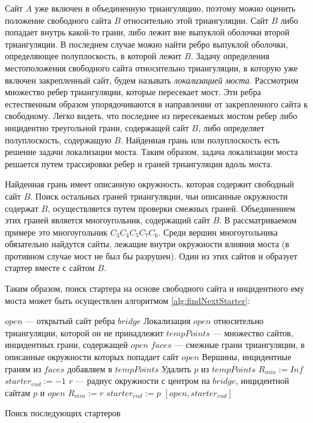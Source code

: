 \documentclass[12pt]{article}
\begin{document}
Сайт $A$ уже включен в объединенную триангуляцию,
поэтому можно оценить положение свободного сайта $B$ относительно этой триангуляции.
Сайт $B$ либо попадает внутрь какой-то грани, либо лежит вне выпуклой оболочки второй триангуляции.
В последнем случае можно найти ребро выпуклой оболочки, определяющее полуплоскость, в которой лежит $B$.
Задачу определения местоположения свободного сайта относительно триангуляции,
в которую уже включен закрепленный сайт, будем называть {\itshape локализацией моста}.
Рассмотрим множество ребер триангуляции, которые пересекает мост.
Эти ребра естественным образом упорядочиваются в направлении от закрепленного сайта к свободному.
Легко видеть, что последнее из пересекаемых мостом ребер либо инцидентно треугольной грани,
содержащей сайт $B$, либо определяет полуплоскость, содержащую $B$.
Найденная грань или полуплоскость есть решение задачи локализации моста.
Таким образом, задача локализации моста решается путем трассировки ребер и граней триангуляции вдоль моста.

Найденная грань имеет описанную окружность, которая содержит свободный сайт $B$.
Поиск остальных граней триангуляции, чьи описанные окружности содержат $B$,
осуществляется путем проверки смежных граней.
Объединением этих граней является многоугольник, содержащий сайт $B$.
В рассматриваемом примере это многоугольник $C_3C_4C_5C_7C_6$.
Среди вершин многоугольника обязательно найдутся сайты,
лежащие внутри окружности влияния моста (в противном случае мост не был бы разрушен).
Один из этих сайтов и образует стартер вместе с сайтом $B$.

Таким образом, поиск стартера на основе свободного сайта и инцидентного ему моста
может быть осуществлен алгоритмом \ref{alg:findNextStarter}:

\begin{algorithm}[htb!]
\begin{algorithmic}[1]
	\State $open$ --- открытый сайт ребра $bridge$
	\State Локализация $open$ относительно триангуляции, которой он не принадлежит
	\State $tempPoints$ --- множество сайтов, инцидентных грани, содержащей $open$
	\State $faces$ --- смежные грани триангуляции, в описанные окружности которых попадает сайт $open$
	\State Вершины, инцидентные граням из $faces$ добавляем в $tempPoints$
			\State Удалить $p$ из $tempPoints$
		\EndIf
	\EndFor
	\State $R_{min} := Inf$
	\State $starter_{end} := -1$
		\State $r$ --- радиус окружности с центром на $bridge$, инцидентной сайтам $p$ и $open$
			\State $R_{min} := r$
			\State $starter_{end} := p$
		\EndIf
	\EndFor
	\Return $[open, starter_{end}]$
\EndProcedure
\end{algorithmic}
\caption{Поиск последующих стартеров}
\label{alg:findNextStarter}
\end{algorithm}
\end{document}
